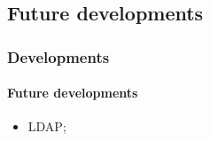 \subsection{Future developments}
\begin{frame}
    \frametitle{Developments}
    \framesubtitle{Future developments}
    \begin{itemize}
        \item LDAP;
    \end{itemize}
\end{frame}
